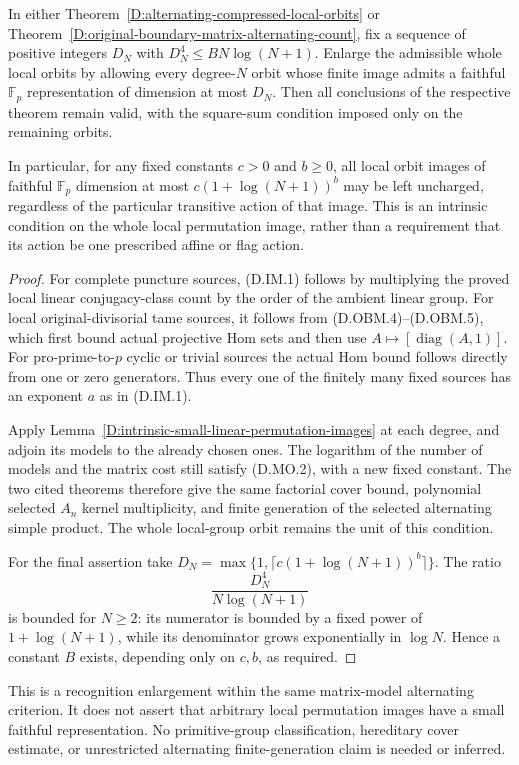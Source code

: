\begin{corollary}
\label{D:intrinsic-linear-orbit-alternating-count}
In either Theorem~\ref{D:alternating-compressed-local-orbits}
or Theorem~\ref{D:original-boundary-matrix-alternating-count},
fix a sequence of positive integers $D_N$ with
$D_N^4\le B N\log(N+1)$. Enlarge the admissible
whole local orbits by allowing every degree-$N$
orbit whose finite image admits a faithful
$\mathbb F_p$ representation of dimension at
most $D_N$. Then all conclusions of the
respective theorem remain valid, with the
square-sum condition imposed only on the
remaining orbits.

In particular, for any fixed constants $c>0$
and $b\ge0$, all local orbit images of
faithful $\mathbb F_p$ dimension at most
$c(1+\log(N+1))^b$ may be left uncharged,
regardless of the particular transitive
action of that image. This is an intrinsic
condition on the whole local permutation
image, rather than a requirement that its
action be one prescribed affine or flag
action.
\end{corollary}

\begin{proof}
For complete puncture sources, (D.IM.1)
follows by multiplying the proved local
linear conjugacy-class count by the order
of the ambient linear group. For local
original-divisorial tame sources, it follows
from (D.OBM.4)--(D.OBM.5), which first
bound actual projective Hom sets and then
use $A\mapsto[\operatorname{diag}(A,1)]$.
For pro-prime-to-$p$ cyclic or trivial
sources the actual Hom bound follows
directly from one or zero generators.
Thus every one of the finitely many fixed
sources has an exponent $a$ as in
(D.IM.1).

Apply Lemma~\ref{D:intrinsic-small-linear-permutation-images}
at each degree, and adjoin its models to
the already chosen ones. The logarithm
of the number of models and the matrix
cost still satisfy (D.MO.2), with a new
fixed constant. The two cited theorems
therefore give the same factorial cover
bound, polynomial selected $A_n$ kernel
multiplicity, and finite generation of
the selected alternating simple product.
The whole local-group orbit remains the
unit of this condition.

For the final assertion take
$D_N=\max\{1,\lceil c(1+\log(N+1))^b\rceil\}$.
The ratio
\[
                  \frac{D_N^4}{N\log(N+1)}              \tag{D.IM.7}
\]
is bounded for $N\ge2$: its numerator
is bounded by a fixed power of
$1+\log(N+1)$, while its denominator
grows exponentially in $\log N$.
Hence a constant $B$ exists, depending
only on $c,b$, as required.
\end{proof}

\begin{remark}
This is a recognition enlargement within
the same matrix-model alternating criterion.
It does not assert that arbitrary local
permutation images have a small faithful
representation. No primitive-group
classification, hereditary cover estimate,
or unrestricted alternating finite-generation
claim is needed or inferred.
\end{remark}
